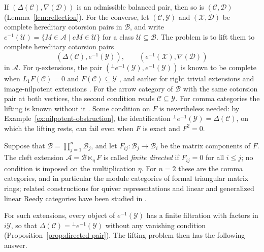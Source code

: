 \documentclass[11pt]{amsart}
\theoremstyle{definition}
\theoremstyle{remark}
\theoremstyle{plain}
\numberwithin{equation}{section}
\begin{document}
If $(\Delta(\mathcal{C}), \nabla(\mathcal{D}))$ is an admissible balanced pair, then so is
$(\mathcal{C}, \mathcal{D})$ (Lemma~\ref{lem:reflection}). For the converse, let
$(\mathcal{C}, \mathcal{Y})$ and $(\mathcal{X}, \mathcal{D})$ be complete hereditary cotorsion pairs in
$\mathcal{B}$, and write $e^{-1}(\mathcal{U}) = \{M \in \mathcal{A} \mid eM \in \mathcal{U}\}$ for a class
$\mathcal{U} \subseteq \mathcal{B}$. The problem is to lift them to complete hereditary
cotorsion pairs
\[
 (\Delta(\mathcal{C}), e^{-1}(\mathcal{Y})), \qquad (e^{-1}(\mathcal{X}), \nabla(\mathcal{D}))
\]
in $\mathcal{A}$. For $\eta$-extensions, the pair
$({}^\perp e^{-1}(\mathcal{Y}), e^{-1}(\mathcal{Y}))$ is known to be complete when
$L_1F(\mathcal{C}) = 0$ and $F(\mathcal{C}) \subseteq \mathcal{Y}$
\cite[Theorem~3.23]{ChenQinYang}, and earlier for right trivial
extensions \cite[Theorem~3.13]{Hu} and image-nilpotent extensions
\cite[Theorem~4.13]{LiuGao}. For the arrow category of $\mathcal{B}$ with the
same cotorsion pair at both vertices, the second condition reads
$\mathcal{C} \subseteq \mathcal{Y}$. For comma categories the lifting is known without it
\cite{HuZhuComma,YuanHeWu}. Some condition on $F$ is nevertheless needed:
by Example~\ref{ex:nilpotent-obstruction}, the identification
${}^\perp e^{-1}(\mathcal{Y}) = \Delta(\mathcal{C})$, on which the lifting rests, can fail
even when $F$ is exact and $F^2 = 0$.

Suppose that $\mathcal{B} = \prod_{j = 1}^n\mathcal{B}_j$, and let $F_{ij}: \mathcal{B}_j \to \mathcal{B}_i$ be
the matrix components of $F$. The cleft extension $\mathcal{A} = \mathcal{B} \ltimes_\eta F$
is called \emph{finite directed} if $F_{ij} = 0$ for all $i \leq j$; no
condition is imposed on the multiplication $\eta$. For $n = 2$ these are
the comma categories, and in particular the module categories of formal
triangular matrix rings; related constructions for quiver
representations and linear and generalized linear Reedy categories have been studied in
\cite{DaleziosStovicek,DiLiLiang,HolmJorgensen}.

For such extensions, every object
of $e^{-1}(\mathcal{Y})$ has a finite filtration with factors in $i\mathcal{Y}$, so that
$\Delta(\mathcal{C}) = {}^\perp e^{-1}(\mathcal{Y})$ without any vanishing condition
(Proposition~\ref{prop:directed-pair}). The lifting problem then has the
following answer.
\end{document}
